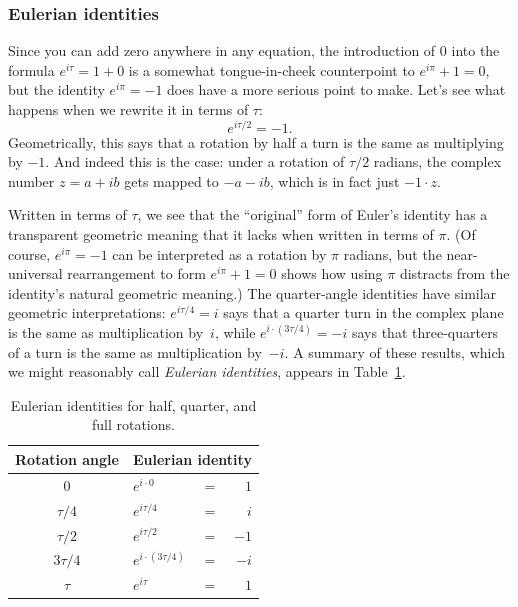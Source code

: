       \subsubsection{Eulerian identities} %
      \label{sec:eulerian_identities}

Since you can add zero anywhere in any equation, the introduction of $0$ into the formula $e^{i\tau} = 1 + 0$ is a somewhat tongue-in-cheek counterpoint to $e^{i\pi} + 1 = 0$, but the identity $e^{i\pi} = -1$ does have a more serious point to make. Let's see what happens when we rewrite it in terms of $\tau$:
\[
e^{i\tau/2} = -1.
\]
Geometrically, this says that a rotation by half a turn is the same as multiplying by $-1$. And indeed this is the case: under a rotation of $\tau/2$ radians, the complex number $z = a + ib$ gets mapped to $-a - ib$, which is in fact just $-1\cdot z$.

Written in terms of $\tau$, we see that the ``original'' form of Euler's identity has a transparent geometric meaning that it lacks when written in terms of $\pi$. (Of course, $e^{i\pi} = -1$ can be interpreted as a rotation by $\pi$ radians, but the near-universal rearrangement to form $e^{i\pi} + 1 = 0$ shows how using $\pi$ distracts from the identity's natural geometric meaning.) The quarter-angle identities have similar geometric interpretations: $e^{i\tau/4} = i$ says that a quarter turn in the complex plane is the same as multiplication by~$i$, while $e^{i\cdot(3\tau/4)} = -i$ says that three-quarters of a turn is the same as multiplication by~$-i$. A summary of these results, which we might reasonably call \emph{Eulerian identities}, appears in Table~\ref{table:eulerian_identities}.

\begin{table}
\begin{center}
\begin{tabular}{cllr}
Rotation angle & \multicolumn{3}{c}{Eulerian identity} \\ \hline
$0$ & $e^{i\cdot0}$ & $ = $ & $1$ \smallskip \\
$\tau/4$ & $e^{i\tau/4}$ & $ = $ & $i$ \smallskip \\
$\tau/2$ & $e^{i\tau/2}$ & $ = $ & $-1$ \smallskip \\
$3\tau/4$ & $e^{i\cdot(3\tau/4)}$ & $ = $ & $-i$ \smallskip \\
$\tau$ & $e^{i\tau}$ & $ = $ & $1$
\end{tabular}
\end{center}
\caption{Eulerian identities for half, quarter, and full rotations.\label{table:eulerian_identities}}
\end{table}

